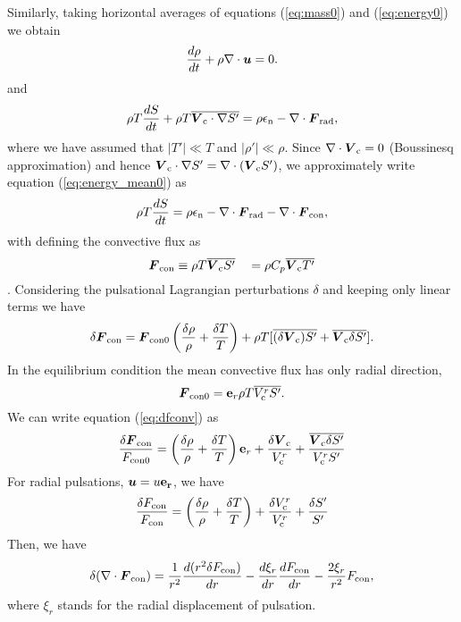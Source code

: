 \documentclass[fleqn,usenatbib]{mnras}
\def\bm#1{\mbox{\boldmath$#1$}}
\begin{document}
Similarly, taking horizontal averages of equations (\ref{eq:mass0})
and (\ref{eq:energy0}) we obtain
\begin{equation}
{d\rho\over dt} + \rho\nabla\cdot\bm{u}=0.
\label{eq:mass_mean}
\end{equation}
and
\begin{equation}
\rho T{dS\over dt} + \rho T\overline{\bm{V}_{\rm c}\cdot\nabla S'} 
= \rho\epsilon_{\rm n}  - \nabla\cdot\bm{F}_{\rm rad}, 
\label{eq:energy_mean0}
\end{equation}
where we have assumed that $|T'|\ll T$ and $|\rho' | \ll \rho$.
Since $\nabla\cdot\bm{V}_{\rm c}=0$ (Boussinesq approximation) and hence
$\bm{V}_{\rm c}\cdot\nabla S' = \nabla\cdot(\bm{V}_{\rm c}S')$,
we approximately write equation (\ref{eq:energy_mean0}) as
\begin{equation}
\rho T{dS\over dt} 
= \rho\epsilon_{\rm n}  - \nabla\cdot\bm{F}_{\rm rad} - \nabla\cdot\bm{F}_{\rm con}, 
\label{eq:energy_mean1}
\end{equation}
with defining the convective flux as
\begin{equation}
\bm{F}_{\rm con} \equiv \rho T\overline{\bm{V}_{\rm c}S'} \quad = \rho C_p\overline{\bm{V}_{\rm c} T'}
\label{eq:fconv} 
\end{equation}
\citep{Unno1967}.
Considering the pulsational Lagrangian perturbations $\delta$ and keeping only linear terms we have
\begin{equation}
\delta\bm{F}_{\rm con}
=\bm{F}_{{\rm con} 0}\left({\delta\rho\over\rho} + {\delta T\over T}\right) 
+ \rho T [\overline{(\delta\bm{V}_{\rm c})S'}+ \overline{\bm{V}_{\rm c}\delta S'}].  
\label{eq:dfconv} 
\end{equation}
In the equilibrium condition the mean convective flux has only radial direction,
\begin{equation}  
\bm{F}_{\rm con 0}= {\bf e}_r \rho T \overline{V_{\rm c}^rS'}.
\label{eq:Fc0} 
\end{equation}
We can write equation (\ref{eq:dfconv}) as
\begin{equation}
{\delta\bm{F}_{\rm con}\over F_{\rm con 0}}
=\left({\delta\rho\over\rho} + {\delta T\over T}\right){\bf e}_r 
+ {\delta\bm{V}_{\rm c}\over V_{\rm c}^r}+ 
{\overline{\bm{V}_{\rm c}\delta S'}\over V_{\rm c}^rS'}  
\label{eq:dfconv2} 
\end{equation}
%
For radial pulsations, $\bm{u}= u\bf{e}_r$, we have
\begin{equation}
{\delta F_{\rm con}\over F_{\rm con}} = \left({\delta\rho\over\rho} + {\delta T\over T}\right)
+ {\delta V_{\rm c}^r\over V_{\rm c}^r}+ {\delta S'\over S'}   
\label{eq:dfconv_r}
\end{equation} 
Then, we have 
\begin{equation}
\delta(\nabla\cdot\bm{F}_{\rm con})
={1\over r^2}{d (r^2 \delta F_{\rm con})\over dr}
-{d\xi_r\over dr}{dF_{\rm con}\over dr}
-{2\xi_r\over r^2}F_{\rm con},
\label{eq:divFc}
\end{equation}
where $\xi_r$ stands for the radial displacement of pulsation.
\end{document}
